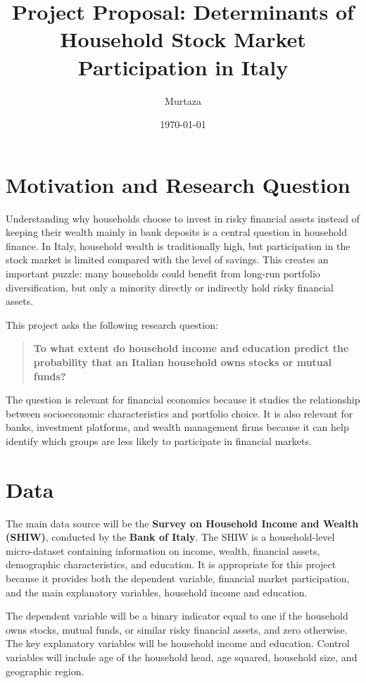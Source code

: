 \documentclass[12pt]{article}
\title{\textbf{Project Proposal: Determinants of Household Stock Market Participation in Italy}}
\author{Murtaza}
\date{\today}
\begin{document}
\maketitle

\section{Motivation and Research Question}

Understanding why households choose to invest in risky financial assets instead of keeping their wealth mainly in bank deposits is a central question in household finance. In Italy, household wealth is traditionally high, but participation in the stock market is limited compared with the level of savings. This creates an important puzzle: many households could benefit from long-run portfolio diversification, but only a minority directly or indirectly hold risky financial assets.

This project asks the following research question:

\begin{quote}
\textbf{To what extent do household income and education predict the probability that an Italian household owns stocks or mutual funds?}
\end{quote}

The question is relevant for financial economics because it studies the relationship between socioeconomic characteristics and portfolio choice. It is also relevant for banks, investment platforms, and wealth management firms because it can help identify which groups are less likely to participate in financial markets.

\section{Data}

The main data source will be the \textbf{Survey on Household Income and Wealth (SHIW)}, conducted by the \textbf{Bank of Italy}. The SHIW is a household-level micro-dataset containing information on income, wealth, financial assets, demographic characteristics, and education. It is appropriate for this project because it provides both the dependent variable, financial market participation, and the main explanatory variables, household income and education.

The dependent variable will be a binary indicator equal to one if the household owns stocks, mutual funds, or similar risky financial assets, and zero otherwise. The key explanatory variables will be household income and education. Control variables will include age of the household head, age squared, household size, and geographic region.
\end{document}
